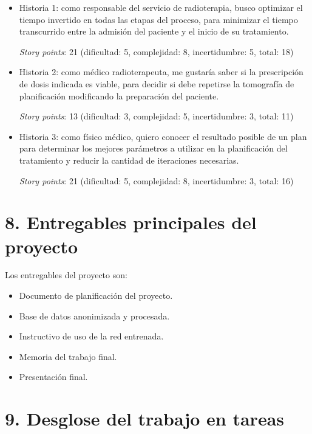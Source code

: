 \documentclass[
11pt, %
codirector, %
]{charter}
\begin{document}
\begin{itemize}
\item Historia 1: como responsable del servicio de radioterapia, busco optimizar el tiempo invertido en todas las etapas del proceso, para minimizar el tiempo transcurrido entre la admisión del paciente y el inicio de su tratamiento.

\textit{Story points}: 21 (dificultad: 5, complejidad: 8, incertidumbre: 5, total: 18)

\item Historia 2: como médico radioterapeuta, me gustaría saber si la prescripción de dosis indicada es viable, para decidir si debe repetirse la tomografía de planificación modificando la preparación del paciente.

\textit{Story points}: 13 (dificultad: 3, complejidad: 5, incertidumbre: 3, total: 11)

\item Historia 3: como físico médico, quiero conocer el resultado posible de un plan para determinar los mejores parámetros a utilizar en la planificación del tratamiento y reducir la cantidad de iteraciones necesarias.

\textit{Story points}: 21 (dificultad: 5, complejidad: 8, incertidumbre: 3, total: 16)
\end{itemize}


\section{8. Entregables principales del proyecto}
\label{sec:entregables}

Los entregables del proyecto son:

\begin{itemize}
	\item Documento de planificación del proyecto.
	\item Base de datos anonimizada y procesada.
	\item Instructivo de uso de la red entrenada.
	\item Memoria del trabajo final.
	\item Presentación final.
\end{itemize}

\section{9. Desglose del trabajo en tareas}
\label{sec:wbs}
\end{document}
